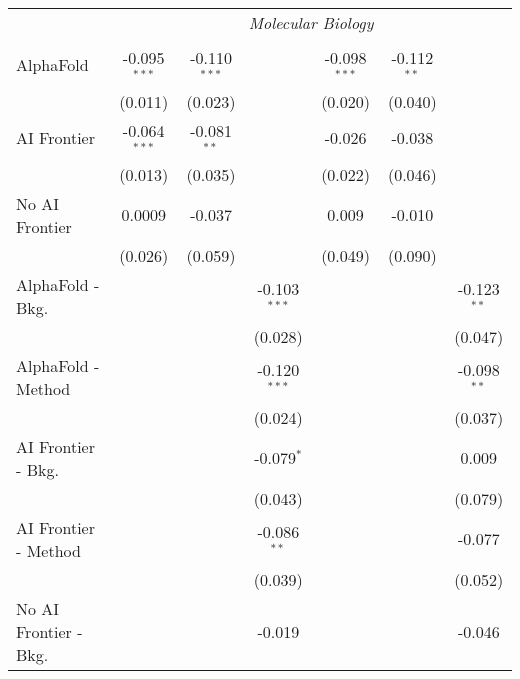 \begin{tabular}{lcccccc}
 & \multicolumn{6}{c}{\textit{Molecular Biology}} \\ \\
   AlphaFold               & -0.095$^{***}$ & -0.110$^{***}$ &                & -0.098$^{***}$ & -0.112$^{**}$ &   \\   
                           & (0.011)        & (0.023)        &                & (0.020)        & (0.040)       &   \\   
   AI Frontier             & -0.064$^{***}$ & -0.081$^{**}$  &                & -0.026         & -0.038        &   \\   
                           & (0.013)        & (0.035)        &                & (0.022)        & (0.046)       &   \\   
   No AI Frontier          & 0.0009         & -0.037         &                & 0.009          & -0.010        &   \\   
                           & (0.026)        & (0.059)        &                & (0.049)        & (0.090)       &   \\   
   AlphaFold - Bkg.        &                &                & -0.103$^{***}$ &                &               & -0.123$^{**}$\\   
                           &                &                & (0.028)        &                &               & (0.047)\\   
   AlphaFold - Method      &                &                & -0.120$^{***}$ &                &               & -0.098$^{**}$\\   
                           &                &                & (0.024)        &                &               & (0.037)\\   
   AI Frontier - Bkg.      &                &                & -0.079$^{*}$   &                &               & 0.009\\   
                           &                &                & (0.043)        &                &               & (0.079)\\   
   AI Frontier - Method    &                &                & -0.086$^{**}$  &                &               & -0.077\\   
                           &                &                & (0.039)        &                &               & (0.052)\\   
   No AI Frontier - Bkg.   &                &                & -0.019         &                &               & -0.046\\   

\end{tabular}
